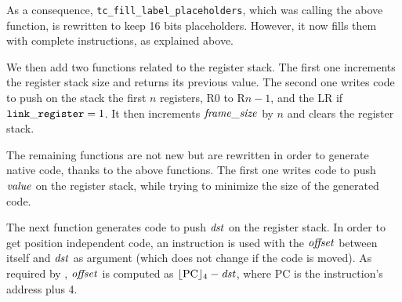 As a consequence, {\tt tc\_fill\_label\_placeholders}, which was calling the
above function, is rewritten to keep 16 bits placeholders. However, it now
fills them with complete  instructions, as explained above.


We then add two functions related to the register stack. The first one
increments the register stack size and returns its previous value. The second
one writes code to push on the stack the first $n$ registers, R0 to R$n-1$, and
the LR if ${\tt link\_register}=1$. It then increments $\it{frame\_size}$ by
$n$ and clears the register stack.


The remaining functions are not new but are rewritten in order to generate
native code, thanks to the above functions. The first one writes code to push
$\it{value}$ on the register stack, while trying to minimize the size of the
generated code.


The next function generates code to push $\it{dst}$ on the register stack. In
order to get position independent code, an 
instruction is used with the $\it{offset}$ between itself and $\it{dst}$ as
argument (which does not change if the code is moved). As required by
, $\it{offset}$ is computed as $\lfloor\mathrm{PC}\rfloor_4-\it{dst}$,
where $\mathrm{PC}$ is the instruction's address plus 4.

